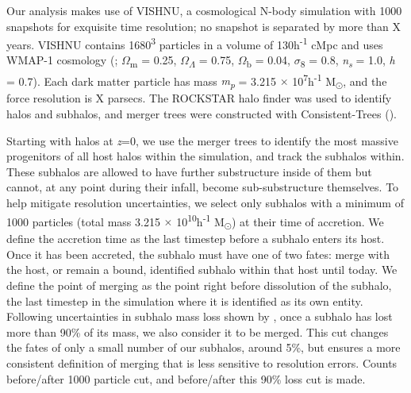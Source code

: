 \documentclass[fleqn,usenatbib]{mnras}
\newcommand\edits[1]{{\color{red}#1}}
\begin{document}
	Our analysis makes use of VISHNU, a cosmological N-body simulation with 1000 snapshots for exquisite time resolution; no snapshot is separated by more than X years. VISHNU contains 1680\textsuperscript{3} particles in a volume of 130h\textsuperscript{-1} cMpc and uses WMAP-1 cosmology (\citet{Spergel2003}; $\Omega$\textsubscript{m} = 0.25, $\Omega$\textsubscript{$\Lambda$} = 0.75, $\Omega$\textsubscript{b} = 0.04, $\sigma$\textsubscript{8} = 0.8, \textit{n\textsubscript{s}} = 1.0, \textit{h} = 0.7). Each dark matter particle has mass \textit{m\textsubscript{p}} = 3.215 $\times$ 10\textsuperscript{7}h\textsuperscript{-1} M\textsubscript{\(\odot\)}, and the force resolution is X parsecs. The ROCKSTAR halo finder was used to identify halos and subhalos, and merger trees were constructed with Consistent-Trees (\citet{Behroozi2013}).
\par
    Starting with halos at \textit{z}=0, we use the merger trees to identify the most massive progenitors of all host halos within the simulation, and track the subhalos within. These subhalos are allowed to have further substructure inside of them but cannot, at any point during their infall, become sub-substructure themselves. To help mitigate resolution uncertainties, we select only subhalos with a minimum of 1000 particles (total mass 3.215 $\times$ 10\textsuperscript{10}h\textsuperscript{-1} M\textsubscript{\(\odot\)}) at their time of accretion. We define the accretion time as the last timestep before a subhalo enters its host. 
    Once it has been accreted, the subhalo must have one of two fates: merge with the host, or remain a bound, identified subhalo within that host until today. We define the point of merging as the point right before dissolution of the subhalo, the last timestep in the simulation where it is identified as its own entity. Following uncertainties in subhalo mass loss shown by \citep{VandenBosch2018}, once a subhalo has lost more than 90\% of its mass, we also consider it to be merged. This cut changes the fates of only a small number of our subhalos, \edits{around 5\%}, but ensures a more consistent definition of merging that is less sensitive to resolution errors. \edits{Counts before/after 1000 particle cut, and before/after this 90\% loss cut is made}.
\end{document}
